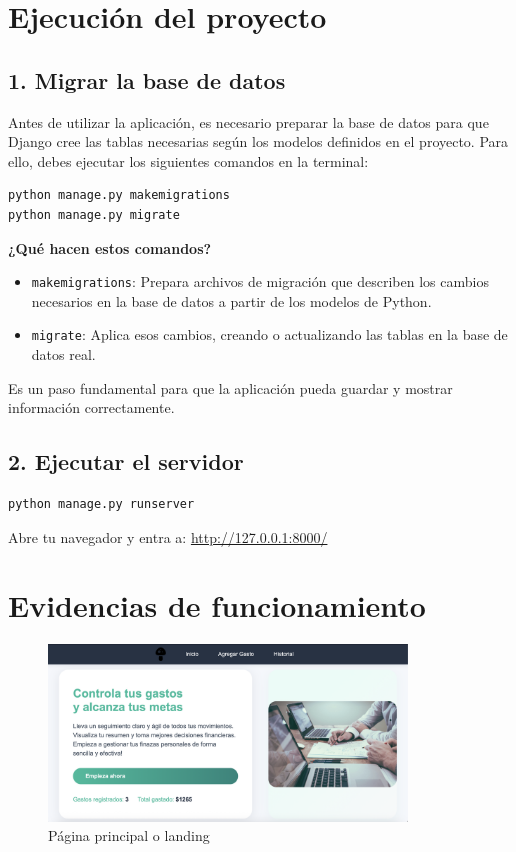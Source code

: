 \documentclass[12pt,a4paper]{article}
\begin{document}
\section{Ejecución del proyecto}

\subsection{1. Migrar la base de datos}

Antes de utilizar la aplicación, es necesario preparar la base de datos para que Django cree las tablas necesarias según los modelos definidos en el proyecto. Para ello, debes ejecutar los siguientes comandos en la terminal:

\begin{lstlisting}[language=bash]
python manage.py makemigrations
python manage.py migrate
\end{lstlisting}

\textbf{¿Qué hacen estos comandos?}

\begin{itemize}
    \item \texttt{makemigrations}: Prepara archivos de migración que describen los cambios necesarios en la base de datos a partir de los modelos de Python.
    \item \texttt{migrate}: Aplica esos cambios, creando o actualizando las tablas en la base de datos real.
\end{itemize}

Es un paso fundamental para que la aplicación pueda guardar y mostrar información correctamente.

\subsection{2. Ejecutar el servidor}

\begin{lstlisting}[language=bash]
python manage.py runserver
\end{lstlisting}

Abre tu navegador y entra a: \url{http://127.0.0.1:8000/}

\section{Evidencias de funcionamiento}

\begin{figure}[H]
    \centering
    \includegraphics[width=0.85\textwidth]{Imagenes/Pagina Principal.png}
    \caption{Página principal o landing}
\end{figure}
\end{document}
